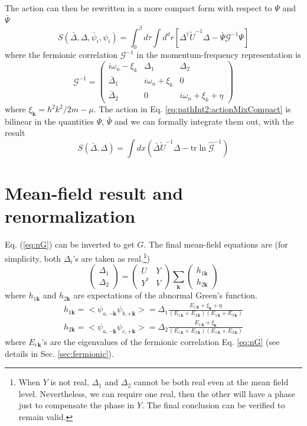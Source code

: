 \documentclass[reprint,pra]{revtex4-1}
\newcommand{\vk}{\ensuremath{\mathbf{k}}}
\newcommand{\br}[1]{\ensuremath{\left(#1\right)}}
\newcommand{\mbr}[1]{\ensuremath{\left[#1\right]}}
\newcommand{\mtrx}[1]{\ensuremath{\begin{pmatrix}#1\end{pmatrix}}}
\newcommand{\dg}{\ensuremath{\dagger}}
\newcommand{\tr}{\ensuremath{\text{tr}}}
\newcommand{\nG}{\ensuremath{\hat{\mathcal{G}}^{-1}}}
\newcommand{\av}[1]{\ensuremath{\bigl<{#1}\bigr>}}
\begin{document}
The action can then be rewritten in a more compact form with respect to $\Psi$ and $\bar\Psi$
\begin{equation}\label{eq:pathInt2:actionMixCompact}
S(\bar\Delta,\Delta,\bar\psi_{i},\psi_{i})=\int^{\beta}_{0}d\tau\int{d^{d}r}
	\mbr{\Delta^{\dg}\tilde{U}^{-1}\Delta-\bar\Psi\mathcal{G}^{-1}\Psi}
\end{equation}
where the fermionic correlation $\mathcal{G}^{-1}$ in the momentum-frequency representation is 
\begin{equation}\label{eq:nG}
\mathcal{G}^{-1}=
\begin{pmatrix}
i\omega_{n}-\xi_{k}&\Delta_{1}&\Delta_{2}\\
\bar\Delta_{1}&i\omega_{n}+\xi_{k}&0\\
\bar\Delta_{2}&0&i\omega_{n}+\xi_{k}+\eta
\end{pmatrix}
\end{equation}
where $\xi_{\vk}=\hbar^{2}k^{2}/2m-\mu$. 
The action in Eq. \ref{eq:pathInt2:actionMixCompact} is  bilinear in the quantities $\Psi$, $\bar\Psi$ and we can formally integrate them out, with the result 
\begin{equation}\label{eq:pathInt2:actionD}
S(\bar{\Delta},\Delta)=\int{dx}\br{\bar{\Delta}\tilde{U}^{-1}\Delta-\tr\ln\nG}
\end{equation}


\section{Mean-field result and renormalization\label{sec:mean}}
 Eq. (\ref{eq:nG}) can be inverted to get $G$.   The final mean-field equations are (for simplicity,  both $\Delta_{i}$'s are taken as real.\footnote{\label{foot:pathInt2:real}When $Y$ is not real, $\Delta_{1}$ and $\Delta_{2}$ cannot be both real even at the mean field level.  Nevertheless, we can require one  real, then the other will have a phase just to compensate the phase in $Y$.  The final conclusion can be verified to remain valid.   }) 
  \begin{equation}\label{eq:pathInt2:mf}
\mtrx{\Delta_1\\\Delta_2}=\mtrx{U&Y\\Y^{*}&V}\sum_{\vk}\mtrx{h_{1\vk}\\h_{2\vk}}
\end{equation}
  where $ h_{1\vk}$ and $ h_{2\vk}$ are expectations of the abnormal Green's function.
  \begin{gather}
  h_{1\vk}=\av{\psi_{a,-{\vk}}\psi_{b,+{\vk}}}
  =\Delta_{1}\frac{E_{1\,\vk}+\xi_{\vk}+\eta}{(E_{1\,\vk}+E_{2\,\vk})(E_{1\,\vk}+E_{3\,\vk})}\label{eq:pathInt2:h1}\\
  h_{2\vk}=\av{\psi_{a,-{\vk}}\psi_{c,+{\vk}}}
  =\Delta_{2}\frac{E_{1\,\vk}+\xi_{\vk}}{(E_{1\,\vk}+E_{2\,\vk})(E_{1\,\vk}+E_{3\,\vk})}\label{eq:pathInt2:h2}
  \end{gather}
   where  $E_{i\,\vk}$'s are the eigenvalues of the fermionic correlation Eq. \ref{eq:nG} (see details in Sec. \ref{sec:fermionic}). 
   
\end{document}
